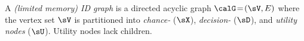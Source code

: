 






\begin{definition}
    \label{def:cid}
    A \emph{(limited memory) ID graph}  is a directed acyclic graph
$\calG\!=\!(\sV,E)$ where the vertex set $\sV$ is partitioned into \emph{chance-} ($\sX$), \emph{decision-} ($\sD$), and \emph{utility
nodes} ($\sU$).
Utility nodes lack children.~
\end{definition}






